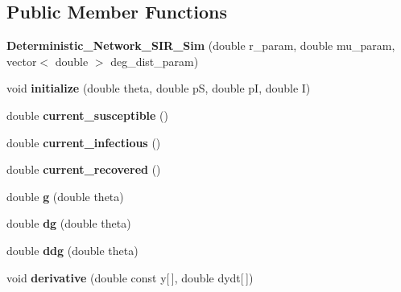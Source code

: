 \subsection*{Public Member Functions}
\begin{DoxyCompactItemize}
\item 
\hypertarget{classDeterministic__Network__SIR__Sim_ab65875e06295f845030460b4c402f9d7}{}{\bfseries Deterministic\+\_\+\+Network\+\_\+\+S\+I\+R\+\_\+\+Sim} (double r\+\_\+param, double mu\+\_\+param, vector$<$ double $>$ deg\+\_\+dist\+\_\+param)\label{classDeterministic__Network__SIR__Sim_ab65875e06295f845030460b4c402f9d7}

\item 
\hypertarget{classDeterministic__Network__SIR__Sim_a87a198e25b592969ffda784290816ab8}{}void {\bfseries initialize} (double theta, double p\+S, double p\+I, double I)\label{classDeterministic__Network__SIR__Sim_a87a198e25b592969ffda784290816ab8}

\item 
\hypertarget{classDeterministic__Network__SIR__Sim_a35e200c2f3647ec2127425a4fa97a6ec}{}double {\bfseries current\+\_\+susceptible} ()\label{classDeterministic__Network__SIR__Sim_a35e200c2f3647ec2127425a4fa97a6ec}

\item 
\hypertarget{classDeterministic__Network__SIR__Sim_af69a8b7222a167f184dfaf8c808562fe}{}double {\bfseries current\+\_\+infectious} ()\label{classDeterministic__Network__SIR__Sim_af69a8b7222a167f184dfaf8c808562fe}

\item 
\hypertarget{classDeterministic__Network__SIR__Sim_abf76f121a50f0182009b3069a4320183}{}double {\bfseries current\+\_\+recovered} ()\label{classDeterministic__Network__SIR__Sim_abf76f121a50f0182009b3069a4320183}

\item 
\hypertarget{classDeterministic__Network__SIR__Sim_a360598da944dafd1e8a3993db714bb9f}{}double {\bfseries g} (double theta)\label{classDeterministic__Network__SIR__Sim_a360598da944dafd1e8a3993db714bb9f}

\item 
\hypertarget{classDeterministic__Network__SIR__Sim_a73d8a92bc7f4b7a2980711fb507c2135}{}double {\bfseries dg} (double theta)\label{classDeterministic__Network__SIR__Sim_a73d8a92bc7f4b7a2980711fb507c2135}

\item 
\hypertarget{classDeterministic__Network__SIR__Sim_ac5aac45f27c42b3b5ae485c6c71343d0}{}double {\bfseries ddg} (double theta)\label{classDeterministic__Network__SIR__Sim_ac5aac45f27c42b3b5ae485c6c71343d0}

\item 
\hypertarget{classDeterministic__Network__SIR__Sim_a5d6952159503bf11223e7f2f5a5d6d9c}{}void {\bfseries derivative} (double const y\mbox{[}$\,$\mbox{]}, double dydt\mbox{[}$\,$\mbox{]})\label{classDeterministic__Network__SIR__Sim_a5d6952159503bf11223e7f2f5a5d6d9c}

\end{DoxyCompactItemize}
